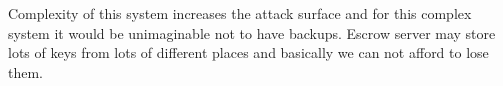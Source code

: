 Complexity of this system increases the attack surface and for this complex system it would be unimaginable not to have backups.
Escrow server may store lots of keys from lots of different places and basically we can not afford to lose them.


